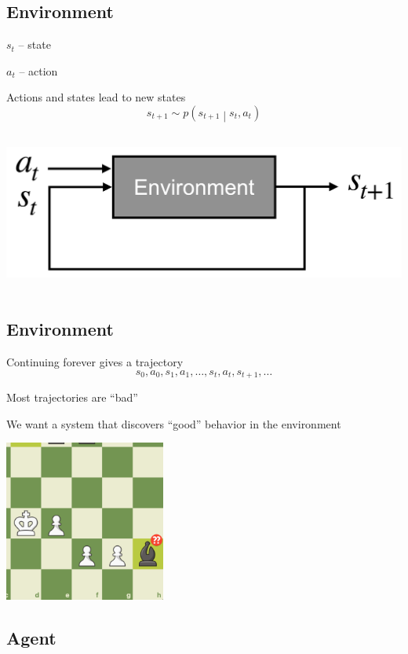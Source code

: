 \documentclass[
  letterpaper,
  DIV=11,
  numbers=noendperiod,
  oneside]{scrartcl}
\begin{document}
\subsection{Environment}\label{environment-1}

\(s_t\) -- state

\(a_t\) -- action

Actions and states lead to new states
\[s_{t+1} \sim p \left( s_{t+1} \middle| s_t, a_t \right)\]

\begin{center}
\includegraphics[width=\textwidth,height=2.08333in]{figs/mdp.png}
\end{center}

\subsection{Environment}\label{environment-2}

Continuing forever gives a trajectory
\[s_0, a_0, s_1, a_1, \ldots, s_{t}, a_{t}, s_{t+1}, \ldots\]

Most trajectories are ``bad''

We want a system that discovers ``good'' behavior in the environment

\begin{center}
\includegraphics[width=\textwidth,height=2.08333in]{figs/blunder.png}
\end{center}

\subsection{Agent}\label{agent}
\end{document}
